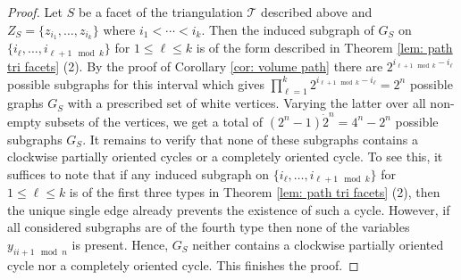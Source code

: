 \documentclass[11pt]{article}
\theoremstyle{definition}
\numberwithin{equation}{section}
\begin{document}
\begin{proof}
Let $S$ be a facet of the triangulation $\mathcal{T}$ described above and $Z_S = \{z_{i_1},\ldots, z_{i_k}\}$ where $i_1<\cdots < i_k$. 
Then the induced subgraph of $G_S$ on $\{i_\ell,\ldots,i_{\ell+1 \mod k}\}$ for $1\leq \ell\leq k$ is of the form described in Theorem \ref{lem: path tri facets} (2). By the proof of Corollary \ref{cor: volume path} there are $2^{i_{\ell+1\mod k}-i_\ell}$ possible subgraphs for this interval which gives $\prod_{\ell=1}^k 2^{i_{\ell+1\mod k}-i_\ell}=2^n$ possible graphs $G_S$ with a prescribed set of white vertices. Varying the latter over all non-empty subsets of the vertices, we get a total of $(2^n-1)\dot 2^n=4^n-2^n$ possible subgraphs $G_S$. It remains to verify that none of these subgraphs contains a clockwise partially oriented cycles or a completely oriented cycle. 
To see this, it suffices to note that if any induced subgraph on $\{i_\ell,\ldots,i_{\ell+1 \mod k}\}$ for  $1\leq \ell\leq k$ is of the first three types in Theorem \ref{lem: path tri facets} (2), then the unique single edge already prevents the existence of such a cycle. 
However, if all considered subgraphs are of the fourth type then none of the variables $y_{ii+1\mod n}$ is present. 
Hence, $G_S$ neither contains a clockwise partially oriented cycle nor a completely oriented cycle. This finishes the proof.
\end{proof}
\end{document}
